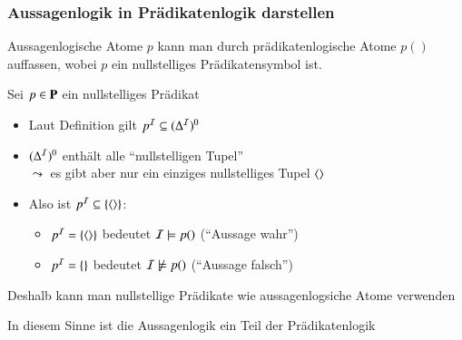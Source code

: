 \documentclass[aspectratio=1610,onlymath]{beamer}
\begin{document}
\begin{frame}\frametitle{Aussagenlogik in Prädikatenlogik darstellen}

Aussagenlogische Atome $p$ kann man durch prädikatenlogische Atome $p()$
auffassen, wobei $p$ ein nullstelliges Prädikatensymbol ist.%
\bigskip

Sei $p\in\textbf{\textcolor{black}{P}}$ ein nullstelliges Prädikat\\[1ex]
\pause
\begin{itemize}
\item Laut Definition gilt $p^{\mathcal{I}}\subseteq(\Delta^{\mathcal{I}})^0$\pause
\item $(\Delta^{\mathcal{I}})^0$ enthält alle "`nullstelligen Tupel"'\\
$\leadsto$ es gibt aber nur ein einziges nullstelliges Tupel $\langle{}\rangle$\pause
\item Also ist $p^{\mathcal{I}}\subseteq\{\langle{}\rangle\}$:
	\begin{itemize}
	\item $p^{\mathcal{I}}=\{\langle{}\rangle\}$ bedeutet $\mathcal{I}\models p()$ (\alert{"`Aussage wahr"'})
	\item $p^{\mathcal{I}}=\{\}$ bedeutet $\mathcal{I}\not\models p()$ (\alert{"`Aussage falsch"'})
	\end{itemize}
\end{itemize}

Deshalb kann man nullstellige Prädikate wie aussagenlogsiche Atome verwenden
\bigskip

In diesem Sinne ist die Aussagenlogik ein Teil der Prädikatenlogik

\end{frame}
\end{document}

